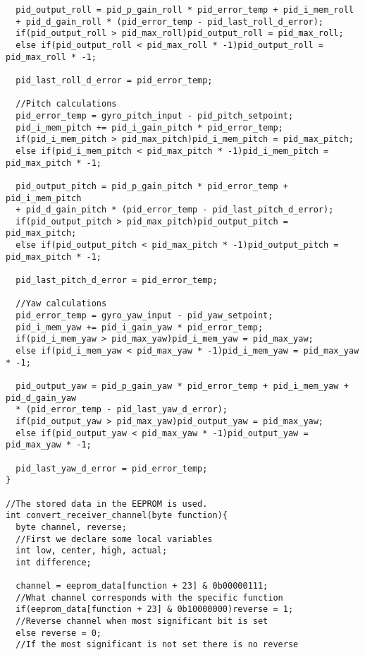 \begin{lstlisting}
  pid_output_roll = pid_p_gain_roll * pid_error_temp + pid_i_mem_roll 
  + pid_d_gain_roll * (pid_error_temp - pid_last_roll_d_error);
  if(pid_output_roll > pid_max_roll)pid_output_roll = pid_max_roll;
  else if(pid_output_roll < pid_max_roll * -1)pid_output_roll = pid_max_roll * -1;

  pid_last_roll_d_error = pid_error_temp;

  //Pitch calculations
  pid_error_temp = gyro_pitch_input - pid_pitch_setpoint;
  pid_i_mem_pitch += pid_i_gain_pitch * pid_error_temp;
  if(pid_i_mem_pitch > pid_max_pitch)pid_i_mem_pitch = pid_max_pitch;
  else if(pid_i_mem_pitch < pid_max_pitch * -1)pid_i_mem_pitch = pid_max_pitch * -1;

  pid_output_pitch = pid_p_gain_pitch * pid_error_temp + pid_i_mem_pitch 
  + pid_d_gain_pitch * (pid_error_temp - pid_last_pitch_d_error);
  if(pid_output_pitch > pid_max_pitch)pid_output_pitch = pid_max_pitch;
  else if(pid_output_pitch < pid_max_pitch * -1)pid_output_pitch = pid_max_pitch * -1;

  pid_last_pitch_d_error = pid_error_temp;

  //Yaw calculations
  pid_error_temp = gyro_yaw_input - pid_yaw_setpoint;
  pid_i_mem_yaw += pid_i_gain_yaw * pid_error_temp;
  if(pid_i_mem_yaw > pid_max_yaw)pid_i_mem_yaw = pid_max_yaw;
  else if(pid_i_mem_yaw < pid_max_yaw * -1)pid_i_mem_yaw = pid_max_yaw * -1;

  pid_output_yaw = pid_p_gain_yaw * pid_error_temp + pid_i_mem_yaw + pid_d_gain_yaw 
  * (pid_error_temp - pid_last_yaw_d_error);
  if(pid_output_yaw > pid_max_yaw)pid_output_yaw = pid_max_yaw;
  else if(pid_output_yaw < pid_max_yaw * -1)pid_output_yaw = pid_max_yaw * -1;

  pid_last_yaw_d_error = pid_error_temp;
}

//The stored data in the EEPROM is used.
int convert_receiver_channel(byte function){
  byte channel, reverse;                                                       
  //First we declare some local variables
  int low, center, high, actual;
  int difference;

  channel = eeprom_data[function + 23] & 0b00000111;                           
  //What channel corresponds with the specific function
  if(eeprom_data[function + 23] & 0b10000000)reverse = 1;                      
  //Reverse channel when most significant bit is set
  else reverse = 0;                                                            
  //If the most significant is not set there is no reverse


\end{lstlisting}

